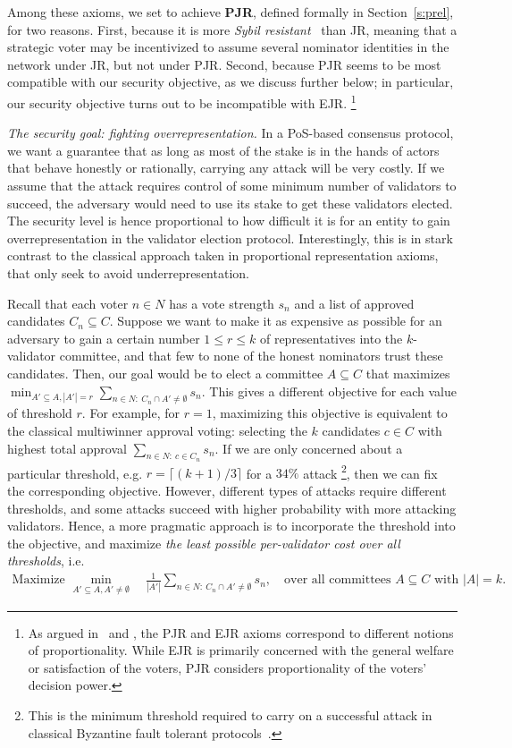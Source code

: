 Among these axioms, we set to achieve \textbf{PJR}, defined formally in Section~\ref{s:prel}, for two reasons. 
First, because it is more \emph{Sybil resistant}~\cite{douceur2002sybil} than JR, meaning that a strategic voter may be incentivized to assume several nominator identities in the network under JR, but not under PJR. 
Second, because PJR seems to be most compatible with our security objective, as we discuss further below; in particular, our security objective turns out to be incompatible with EJR.%
\footnote{As argued in~\cite{peters2019proportionality} and \cite{lackner2020approval}, the PJR and EJR axioms correspond to different notions of proportionality. While EJR is primarily concerned with the general welfare or satisfaction of the voters, PJR considers proportionality of the voters' decision power.} 

\emph{The security goal: fighting overrepresentation.} 
In a PoS-based consensus protocol, we want a guarantee that as long as most of the stake is in the hands of actors that behave honestly or rationally, carrying any attack will be very costly. If we assume that the attack requires control of some minimum number of validators to succeed, the adversary would need to use its stake to get these validators elected. The security level is hence proportional to how difficult it is for an entity to gain overrepresentation in the validator election protocol. 
Interestingly, this is in stark contrast to the classical approach taken in proportional representation axioms, that only seek to avoid underrepresentation. 

Recall that each voter $n\in N$ has a vote strength $s_n$ and a list of approved candidates $C_n\subseteq C$. 
Suppose we want to make it as expensive as possible for an adversary to gain a certain number $1\leq r\leq k$ of representatives into the $k$-validator committee, and that few to none of the honest nominators trust these candidates. Then, our goal would be to elect a committee $A\subseteq C$ that maximizes 
$\min_{A'\subseteq A, |A'|=r} \sum_{n\in N: \ C_n\cap A'\neq \emptyset} s_n$.
This gives a different objective for each value of threshold $r$. 
For example, for $r=1$, maximizing this objective is equivalent to the classical multiwinner approval voting: selecting the $k$ candidates $c\in C$ with highest total approval $\sum_{n\in N: \ c\in C_n} s_n$. 
If we are only concerned about a particular threshold, e.g. $r=\lceil(k+1)/3\rceil$ for a $34\%$ attack%
\footnote{This is the minimum threshold required to carry on a successful attack in classical Byzantine fault tolerant protocols~\cite{pease1980reaching}.}, 
then we can fix the corresponding objective. However, different types of attacks require different thresholds, and some attacks succeed with higher probability with more attacking validators. Hence, a more pragmatic approach is to incorporate the threshold into the objective, and maximize \emph{the least possible per-validator cost over all thresholds}, i.e.  
\begin{align}\label{eq:security}
    \text{Maximize } \min_{A'\subseteq A, A'\neq \emptyset} \quad \frac{1}{|A'|} \sum_{n\in N: \ C_n\cap A' \neq \emptyset} s_n, \quad \text{over all committees $A\subseteq C$ with $|A|=k$}.
\end{align}

